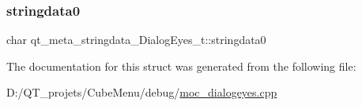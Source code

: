 \subsubsection{\texorpdfstring{stringdata0}{stringdata0}}
{\footnotesize\ttfamily char qt\+\_\+meta\+\_\+stringdata\+\_\+\+Dialog\+Eyes\+\_\+t\+::stringdata0}



The documentation for this struct was generated from the following file\+:\begin{DoxyCompactItemize}
\item 
D\+:/\+Q\+T\+\_\+projets/\+Cube\+Menu/debug/\hyperlink{debug_2moc__dialogeyes_8cpp}{moc\+\_\+dialogeyes.\+cpp}\end{DoxyCompactItemize}
